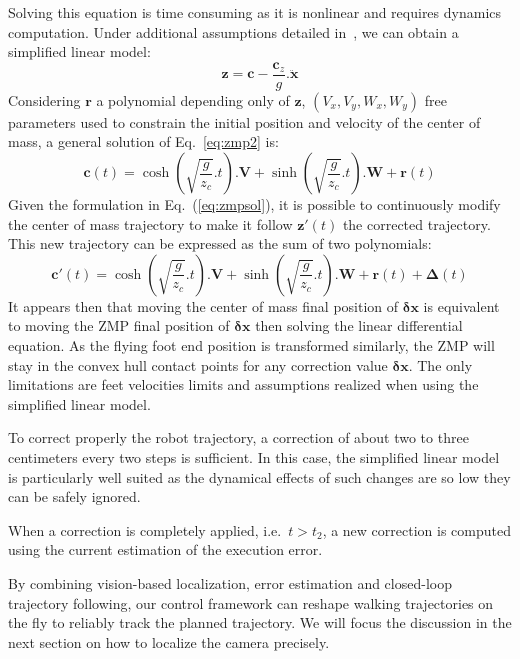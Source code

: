 Solving this equation is time consuming as it is nonlinear and
requires dynamics computation. Under additional assumptions detailed
in~\cite{Kajita01iros}, we can obtain a simplified linear model:
%
\begin{equation} \label{eq:zmp2}
  \mathbf{z} = \mathbf{c} - \frac{\mathbf{c}_z}{g} . \ddot{\mathbf{x}}
\end{equation}
%
Considering $\mathbf{r}$ a polynomial depending only of $\mathbf{z}$,
$(V_x, V_y, W_x, W_y)$ free parameters used to constrain the initial
position and velocity of the center of mass, a general solution of
Eq.~\ref{eq:zmp2} is:
%
\begin{equation} \label{eq:zmpsol}
  \mathbf{c}(t) = \cosh(\sqrt{\frac{g}{z_c}}.t) . \mathbf{V} + \sinh(\sqrt{\frac{g}{z_c}}.t) . \mathbf{W} + \mathbf{r}(t)
\end{equation}
%
Given the formulation in Eq.~(\ref{eq:zmpsol}), it is possible to
continuously modify the center of mass trajectory to make it follow
\mbox{$\mathbf{z}'(t)$} the corrected trajectory. This new
trajectory can be expressed as the sum of two polynomials:
%
\begin{equation} \label{eq:zmpsolcor}
  \mathbf{c}'(t) = \cosh(\sqrt{\frac{g}{z_c}}.t) . \mathbf{V} +
  \sinh(\sqrt{\frac{g}{z_c}}.t) . \mathbf{W} + \mathbf{r}(t) + \mathbf{\Delta}(t)
\end{equation}
%
It appears then that moving the center of mass final position of
$\mathbf{\delta x}$ is equivalent to moving the ZMP final position of
$\mathbf{\delta x}$ then solving the linear differential equation. As
the flying foot end position is transformed similarly, the ZMP will
stay in the convex hull contact points for any correction value
$\mathbf{\delta x}$. The only limitations are feet velocities limits
and assumptions realized when using the simplified linear model.

To correct properly the robot trajectory, a correction of about two to
three centimeters every two steps is sufficient. In this case, the
simplified linear model is particularly well suited as the dynamical
effects of such changes are so low they can be safely ignored.

When a correction is completely applied, i.e.\ $t > t_2$, a new
correction is computed using the current estimation of the execution
error.

By combining vision-based localization, error estimation and
closed-loop trajectory following, our control framework can reshape
walking trajectories on the fly to reliably track the planned
trajectory. We will focus the discussion in the next section on how to
localize the camera precisely.

